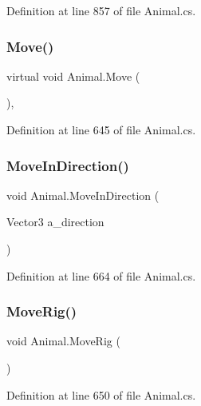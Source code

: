 Definition at line 857 of file Animal.\+cs.

\mbox{\label{class_animal_a088f83df034d3965382b6d8149a7143d}} 
\subsubsection{\texorpdfstring{Move()}{Move()}}
{\footnotesize\ttfamily virtual void Animal.\+Move (\begin{DoxyParamCaption}{ }\end{DoxyParamCaption})\hspace{0.3cm}{\ttfamily [protected]}, {\ttfamily [virtual]}}



Definition at line 645 of file Animal.\+cs.

\mbox{\label{class_animal_ab06d0e969d8991b816f024e156608cb5}} 
\subsubsection{\texorpdfstring{Move\+In\+Direction()}{MoveInDirection()}}
{\footnotesize\ttfamily void Animal.\+Move\+In\+Direction (\begin{DoxyParamCaption}\item[{Vector3}]{a\+\_\+direction }\end{DoxyParamCaption})}



Definition at line 664 of file Animal.\+cs.

\mbox{\label{class_animal_a3eddbb966da9cfcd7cd08f96157c01f9}} 
\subsubsection{\texorpdfstring{Move\+Rig()}{MoveRig()}}
{\footnotesize\ttfamily void Animal.\+Move\+Rig (\begin{DoxyParamCaption}{ }\end{DoxyParamCaption})}



Definition at line 650 of file Animal.\+cs.

